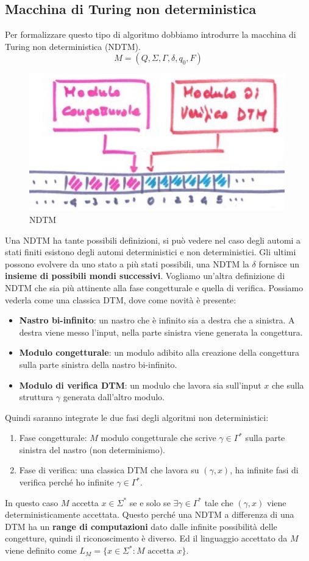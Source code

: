 \documentclass{article}
\begin{document}
\subsection{Macchina di Turing non deterministica}
Per formalizzare questo tipo di algoritmo dobbiamo introdurre la macchina di Turing
non deterministica (NDTM).
$$M=(Q,\Sigma,\Gamma,\delta,q_0,F)$$
\begin{figure}[H]
    \centering
    \includegraphics[scale=0.6]{images/ndtm.png}
    \caption{NDTM}
\end{figure}
Una NDTM ha tante possibili definizioni, si può vedere nel caso degli automi a stati finiti
esistono degli automi deterministici e non deterministici. Gli ultimi possono evolvere da uno
stato a più stati possibili, una NDTM la $\delta$ fornisce un \textbf{insieme di possibili mondi
successivi}. Vogliamo un'altra definizione di NDTM che sia più attinente alla fase
congetturale e quella di verifica.
Possiamo vederla come una classica DTM, dove come novità è presente:
\begin{itemize}
    \item \textbf{Nastro bi-infinito}: un nastro che è infinito sia a destra
          che a sinistra. A destra viene messo l'input, nella parte sinistra viene
          generata la congettura.
    \item \textbf{Modulo congetturale}: un modulo adibito alla creazione
          della congettura sulla parte sinistra della nastro bi-infinito.
    \item \textbf{Modulo di verifica DTM}: un modulo che lavora sia sull'input $x$
          che sulla struttura $\gamma$ generata dall'altro modulo.
\end{itemize}
Quindi saranno integrate le due fasi degli algoritmi non deterministici:
\begin{enumerate}
    \item Fase congetturale: $M$ modulo congetturale che scrive $\gamma\in\Gamma^*$ sulla
          parte sinistra del nastro (non determinismo).
    \item Fase di verifica: una classica DTM che lavora su $(\gamma,x)$, ha infinite
          fasi di verifica perché ho infinite $\gamma\in\Gamma^*$.
\end{enumerate}
In questo caso $M$ accetta $x\in\Sigma^*$ se e solo se $\exists\gamma\in\Gamma^*$ tale
che $(\gamma,x)$ viene deterministicamente accettata.
Questo perché una NDTM a differenza di una DTM ha un \textbf{range di computazioni}
dato dalle infinite possibilità delle congetture, quindi il riconoscimento è diverso.
Ed il linguaggio accettato da $M$ viene definito come $L_M=\{x\in\Sigma^*:M\text{ accetta }x\}$.
\end{document}
